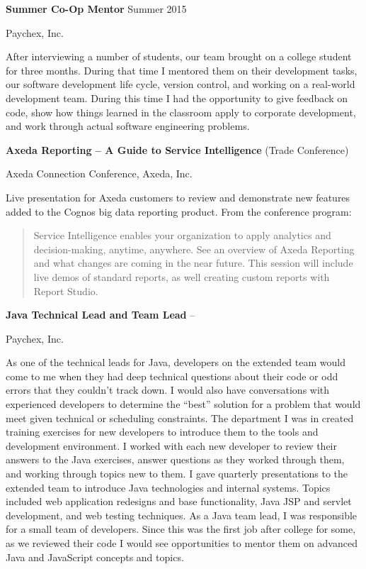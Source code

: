\documentclass[MMMMyyyy,nonstopmode]{simpleresumecv_stacked}
\begin{document}
\begin{Body}
\BigGap
\Entry
\textbf{Summer Co-Op Mentor}
\hfill
Summer 2015

Paychex, Inc.
\begin{Detail}
\Item
After interviewing a number of students, our team brought on a college student for three months. During that time I mentored them on their development tasks, our software development life cycle, version control, and working on a real-world development team. During this time I had the opportunity to give feedback on code, show how things learned in the classroom apply to corporate development, and work through actual software engineering problems.
\end{Detail}
\fi      %

\BigGap
\Entry
\textbf{Axeda Reporting -- A Guide to Service Intelligence} (Trade Conference)
\hfill
{}

Axeda Connection Conference, Axeda, Inc.
\begin{Detail}
\Item
Live presentation for Axeda customers to review and demonstrate new features added to the Cognos big data reporting product.
\ifB
\Item
From the conference program:
\begin{quote}
Service Intelligence enables your organization to apply analytics and decision-making, anytime, anywhere. See an overview of Axeda Reporting and what changes are coming in the near future. This session will include live demos of standard reports, as well creating custom reports with Report Studio.
\end{quote}
\fi
\end{Detail}

\ifC      %
\BigGap
\Entry
\textbf{Java Technical Lead and Team Lead}
\hfill
{} -- 

Paychex, Inc.
\begin{Detail}
\BulletItem
As one of the technical leads for Java, developers on the extended team would come to me when they had deep technical questions about their code or odd errors that they couldn't track down. I would also have conversations with experienced developers to determine the ``best'' solution for a problem that would meet given technical or scheduling constraints.
\BulletItem
The department I was in created training exercises for new developers to introduce them to the tools and development environment. I worked with each new developer to review their answers to the Java exercises,  answer questions as they worked through them, and working through topics new to them.
\BulletItem
I gave quarterly presentations to the extended team to introduce Java technologies and internal systems. Topics included web application redesigns and base functionality, Java JSP and servlet development, and web testing techniques.
\BulletItem
As a Java team lead, I was responsible for a small team of developers. Since this was the first job after college for some, as we reviewed their code I would see opportunities to mentor them on advanced Java and JavaScript concepts and topics.
\end{Detail}
\fi      %


\end{Body}
\end{document}
